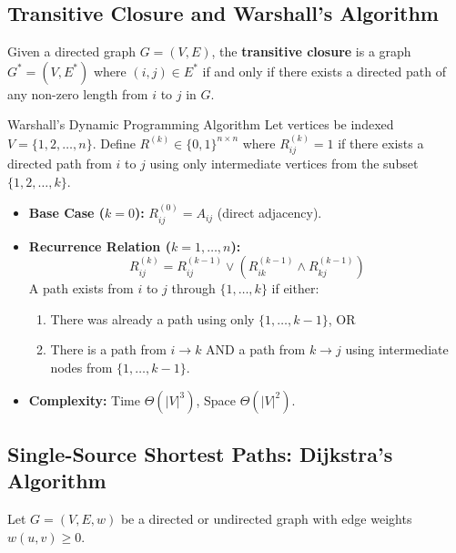 \subsection{Transitive Closure and Warshall's Algorithm}

Given a directed graph $G = (V, E)$, the \textbf{transitive closure} is a graph $G^* = (V, E^*)$ where $(i, j) \in E^*$ if and only if there exists a directed path of any non-zero length from $i$ to $j$ in $G$.

\begin{theorembox}{Warshall's Dynamic Programming Algorithm}
Let vertices be indexed $V = \{1, 2, \dots, n\}$. Define $R^{(k)} \in \{0, 1\}^{n \times n}$ where $R^{(k)}_{ij} = 1$ if there exists a directed path from $i$ to $j$ using only intermediate vertices from the subset $\{1, 2, \dots, k\}$.
\begin{itemize}
    \item \textbf{Base Case ($k = 0$):} $R^{(0)}_{ij} = A_{ij}$ (direct adjacency).
    \item \textbf{Recurrence Relation ($k = 1, \dots, n$):}
    \begin{equation}
    R^{(k)}_{ij} = R^{(k-1)}_{ij} \lor \left( R^{(k-1)}_{ik} \land R^{(k-1)}_{kj} \right)
    \end{equation}
    A path exists from $i$ to $j$ through $\{1, \dots, k\}$ if either:
    \begin{enumerate}
        \item There was already a path using only $\{1, \dots, k-1\}$, OR
        \item There is a path from $i \to k$ AND a path from $k \to j$ using intermediate nodes from $\{1, \dots, k-1\}$.
    \end{enumerate}
    \item \textbf{Complexity:} Time $\Theta(|V|^3)$, Space $\Theta(|V|^2)$.
\end{itemize}
\end{theorembox}

\subsection{Single-Source Shortest Paths: Dijkstra's Algorithm}

Let $G = (V, E, w)$ be a directed or undirected graph with edge weights $w(u, v) \ge 0$.

